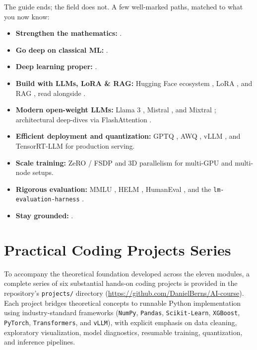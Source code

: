 \documentclass[11pt,a4paper]{article}
\begin{document}
	The guide ends; the field does not. A few well-marked paths, matched to what you now know:
	\begin{itemize}
		\item \textbf{Strengthen the mathematics:} \parencite{strang2019, wasserman2004, boyd2004}.
		\item \textbf{Go deep on classical ML:} \parencite{hastie2009, bishop2006, pedregosa2011}.
		\item \textbf{Deep learning proper:} \parencite{goodfellow2016, bishop2024, zhang2023}.
		\item \textbf{Build with LLMs, LoRA \& RAG:} Hugging Face ecosystem \parencite{wolf2020}, LoRA \parencite{hu2021}, and RAG \parencite{lewis2020}, read alongside \parencite{vaswani2017, brown2020, ouyang2022, rafailov2023}.
		\item \textbf{Modern open-weight LLMs:} Llama 3 \parencite{dubey2024}, Mistral \parencite{jiang2023mistral}, and Mixtral \parencite{jiang2024mixtral}; architectural deep-dives via FlashAttention \parencite{dao2022flashattention, dao2023flashattention2}.
		\item \textbf{Efficient deployment and quantization:} GPTQ \parencite{frantar2022gptq}, AWQ \parencite{lin2023awq}, vLLM \parencite{kwon2023vllm}, and TensorRT-LLM for production serving.
		\item \textbf{Scale training:} ZeRO / FSDP \parencite{rajbhandari2020zero} and 3D parallelism \parencite{narayanan2021megatron} for multi-GPU and multi-node setups.
		\item \textbf{Rigorous evaluation:} MMLU \parencite{hendrycks2021mmlu}, HELM \parencite{liang2022helm}, HumanEval \parencite{chen2021humaneval}, and the \texttt{lm-evaluation-harness} \parencite{gao2021harness}.
		\item \textbf{Stay grounded:} \parencite{christian2020, bender2021}.
	\end{itemize}

	\clearpage
	\section*{Practical Coding Projects Series}
	
	To accompany the theoretical foundation developed across the eleven modules, a complete series of six substantial hands-on coding projects is provided in the repository's \texttt{projects/} directory (\url{https://github.com/DanielBerns/AI-course}). Each project bridges theoretical concepts to runnable Python implementation using industry-standard frameworks (\texttt{NumPy}, \texttt{Pandas}, \texttt{Scikit-Learn}, \texttt{XGBoost}, \texttt{PyTorch}, \texttt{Transformers}, and \texttt{vLLM}), with explicit emphasis on data cleaning, exploratory visualization, model diagnostics, resumable training, quantization, and inference pipelines.
\end{document}
